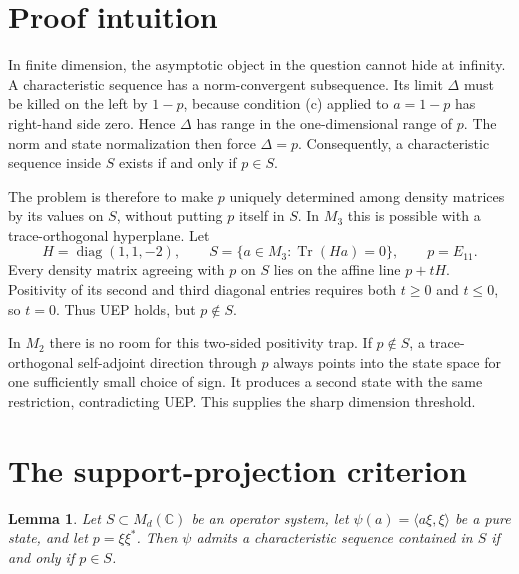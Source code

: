 \documentclass[11pt]{article}
\newtheorem{lemma}[theorem]{Lemma}
\theoremstyle{remark}
\newcommand{\Md}{M_d(\mathbb C)}
\newcommand{\Tr}{\operatorname{Tr}}
\begin{document}
\section{Proof intuition}

In finite dimension, the asymptotic object in the question cannot hide at
infinity.  A characteristic sequence has a norm-convergent subsequence.  Its
limit $\Delta$ must be killed on the left by $1-p$, because condition (c)
applied to $a=1-p$ has right-hand side zero.  Hence $\Delta$ has range in the
one-dimensional range of $p$.  The norm and state normalization then force
$\Delta=p$.  Consequently, a characteristic sequence inside $S$ exists if
and only if $p\in S$.

The problem is therefore to make $p$ uniquely determined among density
matrices by its values on $S$, without putting $p$ itself in $S$.  In $M_3$
this is possible with a trace-orthogonal hyperplane.  Let
\[
 H=\operatorname{diag}(1,1,-2),\qquad
 S=\{a\in M_3:\Tr(Ha)=0\},\qquad p=E_{11}.
\]
Every density matrix agreeing with $p$ on $S$ lies on the affine line
$p+tH$.  Positivity of its second and third diagonal entries requires both
$t\geq0$ and $t\leq0$, so $t=0$.  Thus UEP holds, but $p\notin S$.

In $M_2$ there is no room for this two-sided positivity trap.  If $p\notin S$,
a trace-orthogonal self-adjoint direction through $p$ always points into the
state space for one sufficiently small choice of sign.  It produces a second
state with the same restriction, contradicting UEP.  This supplies the sharp
dimension threshold.

\section{The support-projection criterion}

\begin{lemma}\label{lem:criterion}
Let $S\subset\Md$ be an operator system, let
$\psi(a)=\langle a\xi,\xi\rangle$ be a pure state, and let
$p=\xi\xi^*$.  Then $\psi$ admits a characteristic sequence contained in
$S$ if and only if $p\in S$.
\end{lemma}
\end{document}
